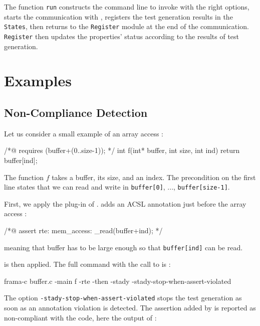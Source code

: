 \documentclass[web]{frama-c-book}
\begin{document}
The function \lstinline[language=OCaml]'run' constructs the command line to invoke \pathcrawler with the right options, starts the communication with \pathcrawler, registers the test generation results in the \lstinline[language=OCaml]'States', then returns to the \lstinline[language=OCaml]'Register' module at the end of the communication.
\lstinline[language=OCaml]'Register' then updates the properties' status according to the results of test generation.


\chapter{Examples}


\section{Non-Compliance Detection}

Let us consider a small example of an array access :

\begin{ccode}
/*@ requires \valid(buffer+(0..size-1)); */
int f(int* buffer, int size, int ind) {
  return buffer[ind];
}
\end{ccode}

The function $f$ takes a buffer, its size, and an index. The precondition on the first line states that we can read and write in \lstinline'buffer[0]', ..., \lstinline'buffer[size-1]'.

First, we apply the  plug-in of \framac.  adds an ACSL annotation just before the array access :

\begin{ccode}
  /*@ assert rte: mem_access: \valid_read(buffer+ind); */
\end{ccode}

meaning that buffer has to be large enough so that \lstinline'buffer[ind]' can be read.

\stady is then applied. The full command with the call to  is :

\begin{shell}
  frama-c buffer.c -main f -rte -then -stady -stady-stop-when-assert-violated
\end{shell}

The option \lstinline[language=shell]'-stady-stop-when-assert-violated' stops the test generation as soon as an annotation violation is detected.
The assertion added by  is reported as non-compliant with the code, here the output of \stady :
\end{document}
